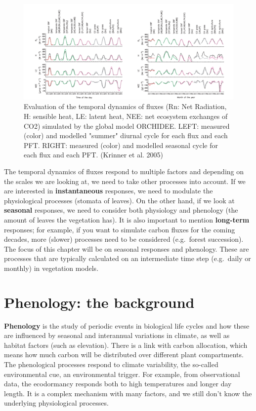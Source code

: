 \documentclass[12pt,oneside]{book}
\begin{document}
\begin{figure}

{\centering \includegraphics[width=0.8\linewidth]{figures/chap4/f41_Krinner} 

}

\caption{Evaluation of the temporal dynamics of fluxes (Rn: Net Radiation, H: sensible heat, LE: latent heat, NEE: net ecosystem exchanges of CO2) simulated by the global model ORCHIDEE. LEFT: measured (color) and modelled "summer" diurnal cycle for each flux and each PFT. RIGHT: measured (color) and modelled seasonal cycle for each flux and each PFT. (Krinner et al. 2005)}\label{fig:f41}
\end{figure}

The temporal dynamics of fluxes respond to multiple factors and
depending on the scales we are looking at, we need to take other
processes into account. If we are interested in \textbf{instantaneous}
responses, we need to modulate the physiological processes (stomata of
leaves). On the other hand, if we look at \textbf{seasonal} responses,
we need to consider both physiology and phenology (the amount of leaves
the vegetation has). It is also important to mention \textbf{long-term}
responses; for example, if you want to simulate carbon fluxes for the
coming decades, more (slower) processes need to be considered
(e.g.~forest succession). The focus of this chapter will be on seasonal
responses and phenology. These are processes that are typically
calculated on an intermediate time step (e.g.~daily or monthly) in
vegetation models.

\section{Phenology: the background}\label{phenology-the-background}

\textbf{Phenology} is the study of periodic events in biological life
cycles and how these are influenced by seasonal and interannual
variations in climate, as well as habitat factors (such as elevation).
There is a link with carbon allocation, which means how much carbon will
be distributed over different plant compartments. The phenological
processes respond to climate variability, the so-called environmental
cue, an environmental trigger. For example, from observational data, the
ecodormancy responds both to high temperatures and longer day length. It
is a complex mechanism with many factors, and we still don't know the
underlying physiological processes.
\end{document}
